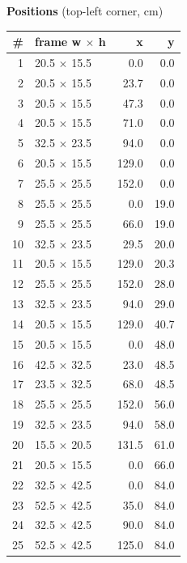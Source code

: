 \documentclass[a4paper,landscape,10pt]{article}
\begin{document}
\begin{minipage}[t]{0.25\textwidth}
\vspace{8pt}
{\bfseries Positions} (top-left corner, cm)\\[2pt]
\tiny
\begin{tabular}{@{}r l r r@{}}
\toprule
\# & frame w $\times$ h & x & y \\
\midrule
1 & 20.5 $\times$ 15.5 & 0.0 & 0.0 \\
2 & 20.5 $\times$ 15.5 & 23.7 & 0.0 \\
3 & 20.5 $\times$ 15.5 & 47.3 & 0.0 \\
4 & 20.5 $\times$ 15.5 & 71.0 & 0.0 \\
5 & 32.5 $\times$ 23.5 & 94.0 & 0.0 \\
6 & 20.5 $\times$ 15.5 & 129.0 & 0.0 \\
7 & 25.5 $\times$ 25.5 & 152.0 & 0.0 \\
8 & 25.5 $\times$ 25.5 & 0.0 & 19.0 \\
9 & 25.5 $\times$ 25.5 & 66.0 & 19.0 \\
10 & 32.5 $\times$ 23.5 & 29.5 & 20.0 \\
11 & 20.5 $\times$ 15.5 & 129.0 & 20.3 \\
12 & 25.5 $\times$ 25.5 & 152.0 & 28.0 \\
13 & 32.5 $\times$ 23.5 & 94.0 & 29.0 \\
14 & 20.5 $\times$ 15.5 & 129.0 & 40.7 \\
15 & 20.5 $\times$ 15.5 & 0.0 & 48.0 \\
16 & 42.5 $\times$ 32.5 & 23.0 & 48.5 \\
17 & 23.5 $\times$ 32.5 & 68.0 & 48.5 \\
18 & 25.5 $\times$ 25.5 & 152.0 & 56.0 \\
19 & 32.5 $\times$ 23.5 & 94.0 & 58.0 \\
20 & 15.5 $\times$ 20.5 & 131.5 & 61.0 \\
21 & 20.5 $\times$ 15.5 & 0.0 & 66.0 \\
22 & 32.5 $\times$ 42.5 & 0.0 & 84.0 \\
23 & 52.5 $\times$ 42.5 & 35.0 & 84.0 \\
24 & 32.5 $\times$ 42.5 & 90.0 & 84.0 \\
25 & 52.5 $\times$ 42.5 & 125.0 & 84.0 \\
\bottomrule
\end{tabular}
\end{minipage}
\clearpage
\end{document}

